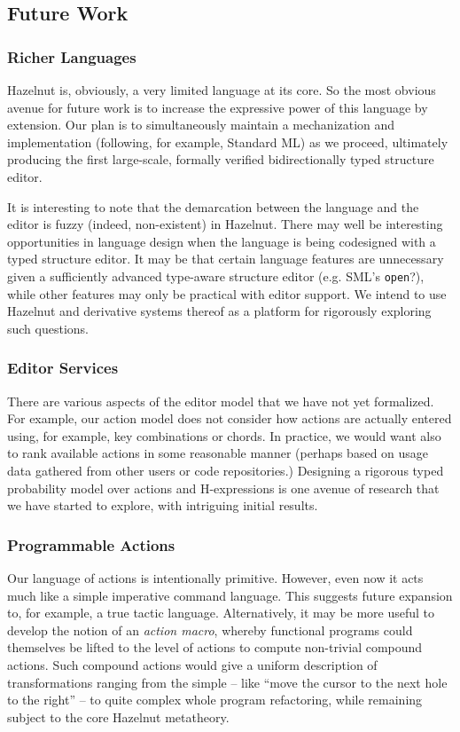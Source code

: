 \documentclass[preprint,9pt]{sigplanconf}
\begin{document}
\subsection{Future Work}
\subsubsection{Richer Languages}
Hazelnut is, obviously, a very limited language at its core. So the most
obvious avenue for future work is to increase the expressive power of this
language by extension. Our plan is to simultaneously maintain a
mechanization and implementation (following, for example, Standard ML) as
we proceed, ultimately producing the first large-scale, formally verified
bidirectionally typed structure editor.

It is interesting to note that the demarcation between the language and the
editor is fuzzy (indeed, non-existent) in Hazelnut. There may well be
interesting opportunities in language design when the language is being
codesigned with a typed structure editor. It may be that certain language
features are unnecessary given a sufficiently advanced type-aware structure
editor (e.g. SML's \texttt{open}?), while other features may only be
practical with editor support. We intend to use Hazelnut and derivative
systems thereof as a platform for rigorously exploring such questions.

\subsubsection{Editor Services}
There are various aspects of the editor model that we have not yet
formalized. For example, our action model does not consider how actions are
actually entered using, for example, key combinations or chords. In
practice, we would want also to rank available actions in some reasonable
manner (perhaps based on usage data gathered from other users or code
repositories.) Designing a rigorous typed probability model over actions
and H-expressions is one avenue of research that we have started to
explore, with intriguing initial results.

\subsubsection{Programmable Actions}
Our language of actions is intentionally primitive. However, even now it
acts much like a simple imperative command language. This suggests future
expansion to, for example, a true tactic language. Alternatively, it may be
more useful to develop the notion of an \emph{action macro}, whereby
functional programs could themselves be lifted to the level of actions to
compute non-trivial compound actions. Such compound actions would give a
uniform description of transformations ranging from the simple -- like
``move the cursor to the next hole to the right'' -- to quite complex whole
program refactoring, while remaining subject to the core Hazelnut
metatheory.
\end{document}
